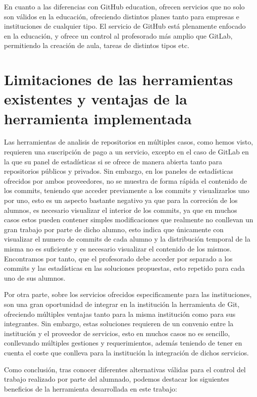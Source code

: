 En cuanto a las diferencias con GitHub education, ofrecen servicios que no
solo son válidos en la educación, ofreciendo distintos planes tanto para
empresas e instituciones de cualquier tipo. El servicio de GitHub está
plenamente enfocado en la educación, y ofrece un control al profesorado más
amplio que GitLab, permitiendo la creación de aula, tareas de distintos
tipos etc.


\section{Limitaciones de las herramientas existentes y ventajas de la
  herramienta implementada}

Las herramientas de analisis de repositorios en múltiples casos, como hemos
visto, requieren una suscripción de pago a un servicio, excepto en el caso
de GitLab en la que su panel de estadísticas si se ofrece de manera abierta
tanto para repositorios públicos y privados. Sin embargo, en los paneles de
estadísticas ofrecidos por ambos proveedores, no se muestra de forma rápida
el contenido de los commits, teniendo que acceder previamente a los commits
y visualizarlos uno por uno, esto es un aspecto bastante negativo ya que
para la correción de los alumnos, es necesario visualizar el interior de
los commits, ya que en muchos casos estos pueden contener simples
modificaciones que realmente no conllevan un gran trabajo por parte de
dicho alumno, esto indica que únicamente con visualizar el numero de
commits de cada alumno y la distribución temporal de la misma no es
suficiente y es necesario visualizar el contenido de los mismos.
Encontramos por tanto, que el profesorado debe acceder por separado a los
commits y las estadísticas en las soluciones propuestas, esto repetido para
cada uno de sus alumnos.

Por otra parte, sobre los servicios ofrecidos especificamente para las
instituciones, son una gran oportunidad de integrar en la institución la
herramienta de Git, ofreciendo múltiples ventajas tanto para la misma
institución como para sus integrantes. Sin embargo, estas soluciones
requieren de un convenio entre la institución y el proveedor de servicios,
esto en muchos casos no es sencillo, conllevando múltiples gestiones y
requerimientos, además teniendo de tener en cuenta el coste que conlleva
para la institución la integración de dichos servicios.

Como conclusión, tras conocer diferentes alternativas válidas para el
control del trabajo realizado por parte del alumnado, podemos destacar los
siguientes beneficios de la herramienta desarrollada en este trabajo:

